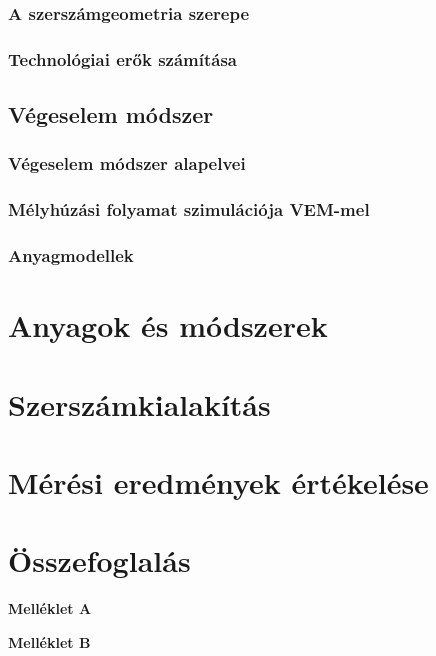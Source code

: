 \documentclass[12pt,a4paper,oneside]{report}
\begin{document}
\subsection{A szerszámgeometria szerepe}
\subsection{Technológiai erők számítása}

\section{Végeselem módszer}
\subsection{Végeselem módszer alapelvei}
\subsection{Mélyhúzási folyamat szimulációja VEM-mel}
\subsection{Anyagmodellek}

\chapter{Anyagok és módszerek}

\chapter{Szerszámkialakítás}

\chapter{Mérési eredmények értékelése}

\chapter{Összefoglalás}



\footnotesize  %

%
\newpage

\appendix
{}
\begin{center}
    \Large\textbf{Melléklet A}
\end{center}
%
\newpage

\begin{center}
    \Large\textbf{Melléklet B}
\end{center}
\end{document}
